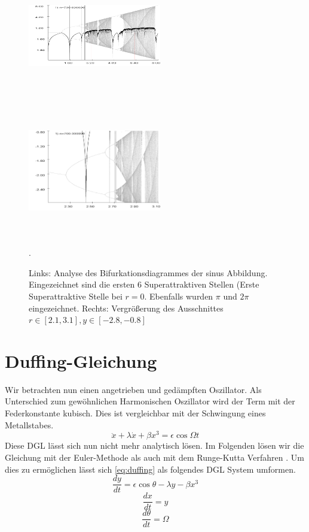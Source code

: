 \documentclass{scrartcl}
\begin{document}
\begin{figure}[!htbp]
\centering
\includegraphics[height=220px, width= 220px]{bifurkation-sin}
\includegraphics[height= 220px, width= 220px]{bifurkation-sin-zoom}
\caption{Links: Analyse des Bifurkationsdiagrammes der sinus Abbildung. Eingezeichnet sind die ersten 6 Superattraktiven Stellen (Erste Superattraktive Stelle bei $r=0$. Ebenfalls wurden $\pi$ und $2\pi$ eingezeichnet. Rechts: Vergrößerung des Ausschnittes $r \in [2.1,3.1], y\in[-2.8,-0.8]$}. 
\label{fig:bifurc-sin}
\end{figure}
\newpage
\section { Duffing-Gleichung}
Wir betrachten nun einen angetrieben und gedämpften Oszillator. Als Unterschied zum gewöhnlichen Harmonischen Oszillator wird der Term mit der Federkonstante kubisch. Dies ist vergleichbar mit der Schwingung eines Metallstabes.
\begin{equation}
\ddot{x}+\lambda\dot{x}+\beta x^3=\epsilon\cos{\Omega t}
\label{eq:duffing}
\end{equation} 
Diese DGL lässt sich nun nicht mehr analytisch lösen.
Im Folgenden lösen wir die Gleichung mit der Euler-Methode \parencite{wiki:euler} als auch mit dem Runge-Kutta Verfahren \parencite{wiki:runge}. Um dies zu ermöglichen lässt sich \eqref{eq:duffing} als folgendes DGL System umformen.
\begin{equation}\frac{dy}{dt}=\epsilon\cos{\theta}-\lambda y - \beta x^3\end{equation}
\begin{equation}\frac{dx}{dt}=y\end{equation}
\begin{equation}\frac{d\theta}{dt}=\Omega\end{equation}
\newline
\end{document}
